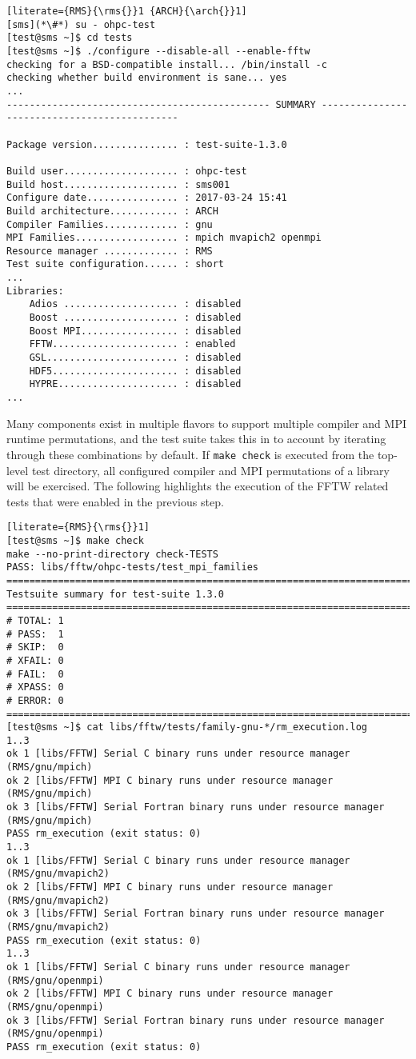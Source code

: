\begin{lstlisting}[literate={RMS}{\rms{}}1 {ARCH}{\arch{}}1]
[sms](*\#*) su - ohpc-test
[test@sms ~]$ cd tests
[test@sms ~]$ ./configure --disable-all --enable-fftw
checking for a BSD-compatible install... /bin/install -c
checking whether build environment is sane... yes
...
---------------------------------------------- SUMMARY ---------------------------------------------

Package version............... : test-suite-1.3.0

Build user.................... : ohpc-test
Build host.................... : sms001
Configure date................ : 2017-03-24 15:41
Build architecture............ : ARCH
Compiler Families............. : gnu
MPI Families.................. : mpich mvapich2 openmpi
Resource manager ............. : RMS
Test suite configuration...... : short
...
Libraries:
    Adios .................... : disabled
    Boost .................... : disabled
    Boost MPI................. : disabled
    FFTW...................... : enabled
    GSL....................... : disabled
    HDF5...................... : disabled
    HYPRE..................... : disabled
...
\end{lstlisting}

Many \OHPC{} components exist in multiple flavors to support multiple compiler
and MPI runtime permutations, and the test suite takes this in to account by
iterating through these combinations by default. If \texttt{make check} is
executed from the top-level test directory, all configured compiler and MPI
permutations of a library will be exercised. The following highlights the
execution of the FFTW related tests that were enabled in the previous step.

\begin{lstlisting}[literate={RMS}{\rms{}}1]
[test@sms ~]$ make check
make --no-print-directory check-TESTS
PASS: libs/fftw/ohpc-tests/test_mpi_families
============================================================================
Testsuite summary for test-suite 1.3.0
============================================================================
# TOTAL: 1
# PASS:  1
# SKIP:  0
# XFAIL: 0
# FAIL:  0
# XPASS: 0
# ERROR: 0
============================================================================
[test@sms ~]$ cat libs/fftw/tests/family-gnu-*/rm_execution.log 
1..3
ok 1 [libs/FFTW] Serial C binary runs under resource manager (RMS/gnu/mpich)
ok 2 [libs/FFTW] MPI C binary runs under resource manager (RMS/gnu/mpich)
ok 3 [libs/FFTW] Serial Fortran binary runs under resource manager (RMS/gnu/mpich)
PASS rm_execution (exit status: 0)
1..3
ok 1 [libs/FFTW] Serial C binary runs under resource manager (RMS/gnu/mvapich2)
ok 2 [libs/FFTW] MPI C binary runs under resource manager (RMS/gnu/mvapich2)
ok 3 [libs/FFTW] Serial Fortran binary runs under resource manager (RMS/gnu/mvapich2)
PASS rm_execution (exit status: 0)
1..3
ok 1 [libs/FFTW] Serial C binary runs under resource manager (RMS/gnu/openmpi)
ok 2 [libs/FFTW] MPI C binary runs under resource manager (RMS/gnu/openmpi)
ok 3 [libs/FFTW] Serial Fortran binary runs under resource manager (RMS/gnu/openmpi)
PASS rm_execution (exit status: 0)
\end{lstlisting}
